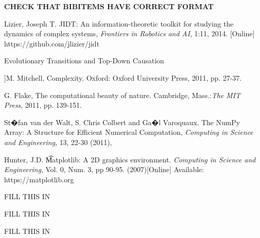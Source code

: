 \documentclass[conference]{IEEEtran}
\begin{document}
%
%
%
{\bf CHECK THAT BIBITEMS HAVE CORRECT FORMAT }
\begin{thebibliography}{1}
  
  Lizier, Joseph T. 
  JIDT: An information-theoretic toolkit for studying the dynamics of complex systems, {\it Frontiers in Robotics and AI}, 1:11, 2014. [Online]  
  https://github.com/jlizier/jidt

 Evolutionary Transitions and Top-Down Causation

 ]M. Mitchell, Complexity. Oxford: Oxford University Press, 2011, pp. 27-37.

 G. Flake, The computational beauty of nature. Cambridge, Mass.:{\it  The MIT Press}, 2011, pp. 139-151.

 St�fan van der Walt, S. Chris Colbert and Ga�l Varoquaux. The NumPy Array: A Structure for Efficient Numerical Computation, {\it Computing in Science and Engineering,} 13, 22-30 (2011),

 Hunter, J.D. {\t Matplotlib: A 2D graphics environment}.  {\it Computing in Science and Engineering}, Vol. 0, Num. 3, pp 90-95.  (2007)[Online]
Available: https://matplotlib.org

 FILL THIS IN

 FILL THIS IN

 FILL THIS IN
\end{thebibliography}




\end{document}

